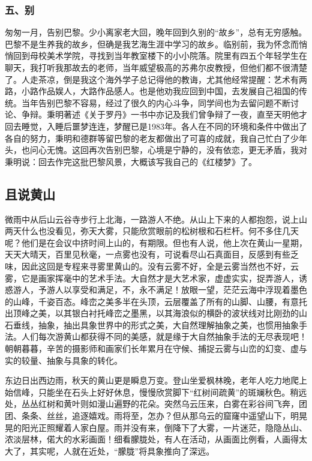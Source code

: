 \documentclass{article}
\begin{document}
\subsubsection{五、别}
匆匆一月，告别巴黎。少小离家老大回，晚年回到久别的“故乡”，总有无穷感触。巴黎不是生养我的故乡，但确是我艺海生涯中学习的故乡。临别前，我为怀念而悄悄回到母校美术学院，寻找到当年教室楼下的小小院落。院里有四五个年轻学生在聊天，我打听我那故去的老师，当年威望极高的苏弗尔皮教授，但他们都不很清楚了。人走茶凉，倒是我这个海外学子总记得他的教诲，尤其他经常提醒：艺术有两路，小路作品娱人，大路作品感人。也是他劝我应回到中国，去发展自己祖国的传统。当年告别巴黎不容易，经过了很久的内心斗争，同学间也为去留问题不断讨论、争辩。秉明著述《关于罗丹》一书中亦记及我们曾争辩了一夜，直至天明他才回去睡觉，入睡后噩梦连连，梦醒已是1983年。各人在不同的环境和条件中做出了各自的努力，秉明和德群等留巴黎的老友都做出了可喜的成就，我自己忙白了少年头，也问心无愧。这回再次告别巴黎，心境是宁静的，没有依恋，更无矛盾，我对秉明说：回去作完这批巴黎风景，大概该写我自己的《红楼梦》了。
\subsection{且说黄山}
微雨中从后山云谷寺步行上北海，一路游人不绝。从山上下来的人都抱怨，说上山两天什么也没看见，弥天大雾，只能欣赏眼前的松树根和石栏杆。何不多住几天呢？他们是在会议中挤时间上山的，有期限。但也有人说，他上次在黄山一星期，天天大晴天，百里见秋毫，一点雾也没有，可说看尽山石真面目，反感到有些乏味，因此这回是专程来寻雾里黄山的。没有云雾不好，全是云雾当然也不好，云雾，它是画家挥毫中的艺术手法。大自然才是大艺术家，虚虚实实，捉弄游人，诱惑游人，予游人以享受和满足，不，永不满足！放眼一望，茫茫云海中浮现着墨色的山峰，千姿百态。峰峦之美多半在头顶，云层覆盖了所有的山脚、山腰，有意托出顶峰之美，以其银白衬托峰峦之墨黑，以其海浪似的横卧的波状线对比刚劲的山石垂线，抽象，抽出具象世界中的形式之美，大自然理解抽象之美，也惯用抽象手法。人们每次游黄山都获得不同的美感，就是缘于大自然抽象手法的无尽表现吧！朝朝暮暮，辛苦的摄影师和画家们长年累月在守候、捕捉云雾与山峦的幻变、虚与实的较量、抽象与具象的转化。

东边日出西边雨，秋天的黄山更是瞬息万变。登山坐爱枫林晚，老年人吃力地爬上始信峰，只能坐在石头上好好休息，慢慢欣赏脚下“红树间疏黄”的斑斓秋色。稍远处，丛丛红树和黄叶则如漫山遍野的花朵。突然乌云压来，白雾在彩谷间飞奔，团团、条条、丝丝，追逐嬉戏。雨将至，怎办？但从那乌云的窟窿中遥望山下，明晃晃的阳光正照耀着人家白屋。雨并没有来，倒降下了大雾，一片迷茫，隐隐丛山、浓淡层林，偌大的水彩画面！细看朦胧处，有人在活动，从画面比例看，人画得太大了，其实呢，人就在近处，“朦胧”将具象推向了深远。
\end{document}

